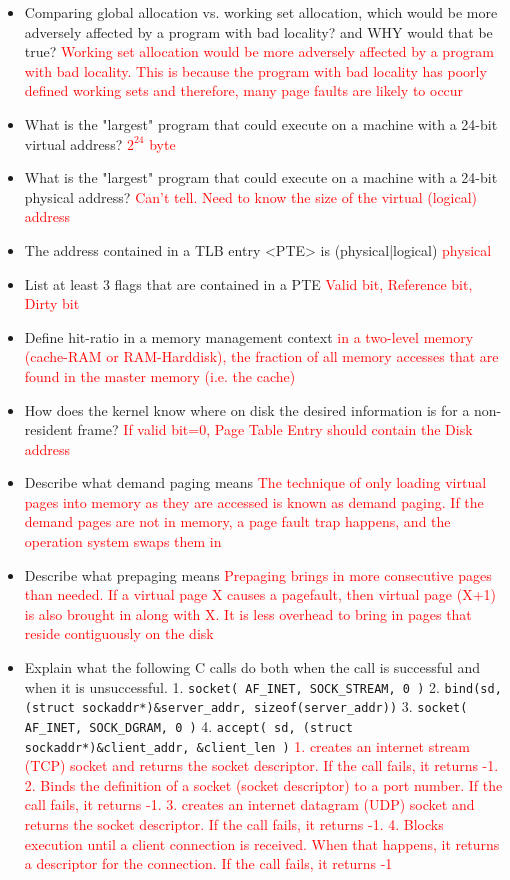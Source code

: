\documentclass[9pt,landscape]{memoir}
\newcommand{\answer}[1]{\textcolor{red}{#1}}
\begin{document}
\begin{multicols}{6}
\begin{itemize}
    \item Comparing global allocation vs. working set allocation, which would be more adversely affected by a program with bad locality? and WHY would that be true?  \answer{Working set allocation would be more adversely affected by a program with bad locality. This is because the program with bad locality has poorly defined working sets and therefore, many page faults are likely to occur}
    \item What is the "largest" program that could execute on a machine with a 24-bit virtual address?  \answer{$2^{24}$ byte}
    \item What is the "largest" program that could execute on a machine with a 24-bit physical address?  \answer{Can't tell. Need to know the size of the virtual (logical) address}
    \item The address contained in a TLB entry <PTE> is (physical|logical) \answer{physical}
    \item List at least 3 flags that are contained in a PTE \answer{Valid bit, Reference bit, Dirty bit}
    \item Define hit-ratio in a memory management context \answer{in a two-level memory (cache-RAM or RAM-Harddisk), the fraction of all memory accesses that are found in the master memory (i.e. the cache)}
    \item How does the kernel know where on disk the desired information is for a non-resident frame?  \answer{If valid bit=0, Page Table Entry should contain the Disk address}
    \item Describe what demand paging means \answer{The technique of only loading virtual pages into memory as they are accessed is known as demand paging. If the demand pages are not in memory, a page fault trap happens, and the operation system swaps them in}
    \item Describe what prepaging means \answer{Prepaging brings in more consecutive pages than needed. If a virtual page X causes a pagefault, then virtual page (X+1) is also brought in along with X. It is less overhead to bring in pages that reside contiguously on the disk}
    \item Explain what the following C calls do both when the call is successful and when it is unsuccessful. 1. \texttt{socket( AF\_INET, SOCK\_STREAM, 0 )} 2. \texttt{bind(sd, (struct sockaddr*)\&server\_addr, sizeof(server\_addr))} 3. \texttt{socket( AF\_INET, SOCK\_DGRAM, 0 )} 4. \texttt{accept( sd, (struct sockaddr*)\&client\_addr, \&client\_len )} \answer{1. creates an internet stream (TCP) socket and returns the socket descriptor. If the call fails, it returns -1. 2. Binds the definition of a socket (socket descriptor) to a port number. If the call fails, it returns -1. 3. creates an internet datagram (UDP) socket and returns the socket descriptor. If the call fails, it returns -1. 4. Blocks execution until a client connection is received. When that happens, it returns a descriptor for the connection. If the call fails, it returns -1}

\end{itemize}
\end{multicols}
\end{document}
